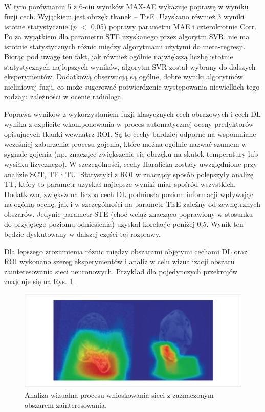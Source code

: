 W tym porównaniu 5 z 6-ciu wyników MAX-AE wykazuje poprawę w wyniku fuzji cech. Wyjątkiem jest obrzęk tkanek -- TisE. Uzyskano również 3 wyniki istotne statystycznie ($p$ $<$ 0,05) poprawy parametru MAE i czterokrotnie Corr. Po za wyjątkiem dla parametru STE uzyskanego przez algorytm SVR, nie ma istotnie statystycznych różnic między algorytmami użytymi do meta-regresji. Biorąc pod uwagę ten fakt, jak również ogólnie największą liczbę istotnie statystycznych najlepszych wyników, algorytm SVR został wybrany do dalszych eksperymentów. Dodatkową obserwacją są ogólne, dobre wyniki algorytmów nieliniowej fuzji, co może sugerować potwierdzenie występowania niewielkich tego rodzaju zależności w ocenie radiologa. 

Poprawa wyników z wykorzystaniem fuzji klasycznych cech obrazowych \linebreak i cech DL wynika z explicite wkomponowania w proces automatycznej oceny predyktorów opisujących tkanki wewnątrz ROI. Są to cechy bardziej odporne na wspomniane wcześniej zaburzenia procesu gojenia, które można ogólnie nazwać szumem w sygnale gojenia (np. znaczące zwiększenie się obrzęku na skutek temperatury lub wysiłku fizycznego). W szczególności, cechy Haralicka zostały uwzględnione przy analizie SCT, TE i TU. Statystyki z ROI w znaczący sposób polepszyły analizę TT, który to parametr uzyskał najlepsze wyniki miar spośród wszystkich. Dodatkowo, zwiększona liczba cech DL podniosła poziom informacji wpływając na ogólną ocenę, jak i w szczególności na parametr TisE zależny od zewnętrznych obszarów. Jedynie parametr STE (choć wciąż znacząco poprawiony w stosunku do przyjętego poziomu odniesienia) uzyskał korelacje poniżej 0,5. Wynik ten będzie dyskutowany w dalszej części tej rozprawy.

Dla lepszego zrozumienia różnic między obszarami objętymi cechami DL oraz ROI wykonano szereg eksperymentów i analiz w celu wizualizacji obszaru zainteresowania sieci neuronowych. Przykład dla pojedynczych przekrojów znajduje się \linebreak na Rys. \ref{fig:XAI}.  
\begin{figure}[h!]
	\centering
	\includegraphics[width=1\textwidth]{figures/XAI.jpg}
	\caption{Analiza wizualna procesu wnioskowania sieci z zaznaczonym obszarem zainteresowania.}\label{fig:XAI}
\end{figure}

